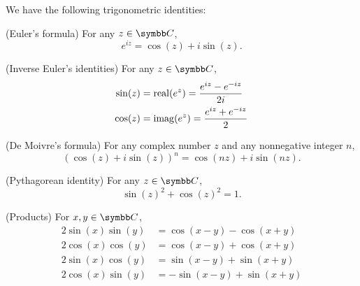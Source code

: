 \begin{proposition}\label{thm:trigonometric_identities}
  We have the following trigonometric identities:
  \begin{PropEnum}
     (Euler's formula) For any \( z \in \BC \),
    \begin{equation}\label{thm:trigonometric_identities/eulers_formula/identity}
      e^{iz} = \cos(z) + i \sin(z).
    \end{equation}

     (Inverse Euler's identities) For any \( z \in \BC \),
    \begin{align}
      \sin(z) & = \operatorname{real}(e^z) = \frac {e^{iz} - e^{-iz}} {2i} \label{thm:trigonometric_identities/inverse_euler/sin} \\
      \cos(z) & = \operatorname{imag}(e^z) = \frac {e^{iz} + e^{-iz}} 2 \label{thm:trigonometric_identities/inverse_euler/cos}
    \end{align}

     (De Moivre's formula) For any complex number \( z \) and any nonnegative integer \( n \),
    \begin{equation}\label{thm:trigonometric_identities/de_moivre/identity}
      (\cos(z) + i \sin(z))^n = \cos(nz) + i \sin(nz).
    \end{equation}

     (Pythagorean identity) For any \( z \in \BC \),
    \begin{equation}\label{thm:trigonometric_identities/pythagorean/identity}
      \sin(z)^2 + \cos(z)^2 = 1.
    \end{equation}

     (Products) For \( x, y \in \BC \),
    \begin{align}
      2 \sin(x) \sin(y) & = \cos(x - y) - \cos(x + y) \label{thm:trigonometric_identities/products/ss}  \\
      2 \cos(x) \cos(y) & = \cos(x - y) + \cos(x + y) \label{thm:trigonometric_identities/products/cc}  \\
      2 \sin(x) \cos(y) & = \sin(x - y) + \sin(x + y) \label{thm:trigonometric_identities/products/sc}  \\
      2 \cos(x) \sin(y) & = -\sin(x - y) + \sin(x + y) \label{thm:trigonometric_identities/products/cs}
    \end{align}


\end{PropEnum}
\end{proposition}
